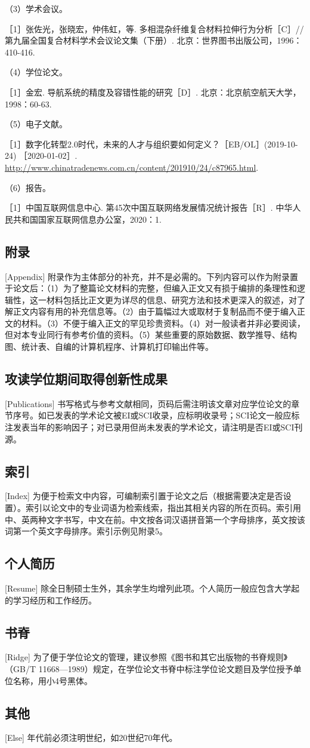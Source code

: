 （3）学术会议。

［1］张佐光，张晓宏，仲伟虹，等. 多相混杂纤维复合材料拉伸行为分析［C］//第九届全国复合材料学术会议论文集（下册）. 北京：世界图书出版公司，1996：410-416.

（4）学位论文。

［1］金宏. 导航系统的精度及容错性能的研究［D］. 北京：北京航空航天大学，1998：60-63.

（5）电子文献。

［1］数字化转型2.0时代，未来的人才与组织要如何定义？［EB/OL］(2019-10-24) ［2020-01-02］. \url{http://www.chinatradenews.com.cn/content/201910/24/c87965.html}.

（6）报告。

［1］中国互联网信息中心. 第45次中国互联网络发展情况统计报告［R］. 中华人民共和国国家互联网信息办公室，2020：1.

\subsection{附录}[Appendix]
附录作为主体部分的补充，并不是必需的。下列内容可以作为附录置于论文后：（1）为了整篇论文材料的完整，但编入正文又有损于编排的条理性和逻辑性，这一材料包括比正文更为详尽的信息、研究方法和技术更深入的叙述，对了解正文内容有用的补充信息等。（2）由于篇幅过大或取材于复制品而不便于编入正文的材料。（3）不便于编入正文的罕见珍贵资料。（4）对一般读者并非必要阅读，但对本专业同行有参考价值的资料。（5）某些重要的原始数据、数学推导、结构图、统计表、自编的计算机程序、计算机打印输出件等。

\subsection{攻读学位期间取得创新性成果}[Publications]
书写格式与参考文献相同，页码后需注明该文章对应学位论文的章节序号。如已发表的学术论文被EI或SCI收录，应标明收录号；SCI论文一般应标注发表当年的影响因子；对已录用但尚未发表的学术论文，请注明是否EI或SCI刊源。

\subsection{索引}[Index]
为便于检索文中内容，可编制索引置于论文之后（根据需要决定是否设置）。索引以论文中的专业词语为检索线索，指出其相关内容的所在页码。索引用中、英两种文字书写，中文在前。中文按各词汉语拼音第一个字母排序，英文按该词第一个英文字母排序。索引示例见附录5。

\subsection{个人简历}[Resume]
除全日制硕士生外，其余学生均增列此项。个人简历一般应包含大学起的学习经历和工作经历。

\subsection{书脊}[Ridge]
为了便于学位论文的管理，建议参照《图书和其它出版物的书脊规则》（GB/T 11668—1989）规定，在学位论文书脊中标注学位论文题目及学位授予单位名称，用小4号黑体。

\subsection{其他}[Else]
年代前必须注明世纪，如20世纪70年代。


